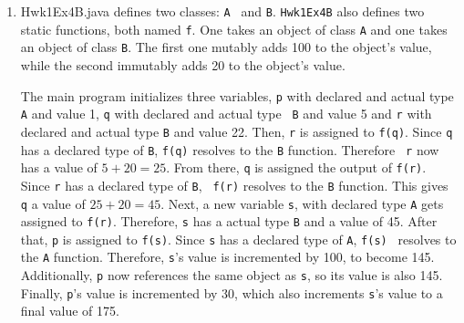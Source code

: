 \documentclass[12pt]{article}
\begin{document}
\begin{enumerate}[label=(\alph*)]
\begin{enumerate}
  \item Hwk1Ex4B.java defines two classes: {\tt A } and {\tt B}. {\tt Hwk1Ex4B} also
    defines two static functions, both named {\tt f}. One takes an object of class
    {\tt A} and one takes an object of class {\tt B}. The first one mutably adds
    100 to the object's value, while the second immutably adds 20 to the object's
    value.

    The main program initializes three variables, {\tt p} with declared and
    actual type {\tt A} and value 1, {\tt q} with declared and actual type {\tt
      B} and value 5 and {\tt r} with declared and actual type {\tt B} and value
    22. Then, {\tt r} is assigned to {\tt f(q)}. Since {\tt q} has a declared
    type of {\tt B}, {\tt f(q)} resolves to the {\tt B} function. Therefore {\tt
      r} now has a value of $ 5 + 20 = 25$. From there, {\tt q} is assigned the
    output of {\tt f(r)}. Since {\tt r} has a declared type of {\tt B}, {\tt
      f(r)} resolves to the {\tt B} function. This gives {\tt q} a value of $25
    + 20 = 45$. Next, a new variable {\tt s}, with declared type {\tt A} gets
    assigned to {\tt f(r)}. Therefore, {\tt s} has a actual type {\tt B} and a
    value of 45. After that, {\tt p} is assigned to {\tt f(s)}. Since {\tt s}
    has a declared type of {\tt A}, {\tt f(s) } resolves to the {\tt A}
    function. Therefore, {\tt s}'s value is incremented by 100, to become 145.
    Additionally, {\tt p} now references the same object as {\tt s}, so its
    value is also 145. Finally, {\tt p}'s value is incremented by 30, which also
    increments {\tt s}'s value to a final value of 175.
  \end{enumerate}
\end{enumerate}
\end{document}
